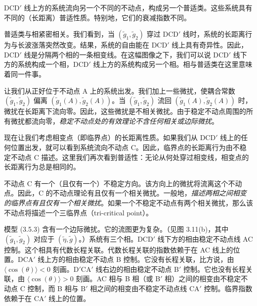 
DCD$'$ 线上方的系统流向另一个不同的不动点，构成另一个普适类。这些系统具有不同的（长距离）普适性质。特别地，它们的衰减指数不同。

普适类与相紧密相关。我们看到，当 $(\tilde{g}_1,\tilde{g}_2)$ 穿过 DCD$'$ 线时，系统的长距离行为与长波涨落突然改变。结果，系统的自由能在 DCD$'$ 线上具有奇异性。因此，DCD$'$ 线是分隔两个相的一条相变线。在这幅图像之下，我们可以说 DCD$'$ 线下方的系统构成一个相，DCD$'$ 线上方的系统构成另一个相。相与普适类在这里意味着同一件事。

让我们从正好位于不动点 A 上的系统出发。我们加上一些微扰，使耦合常数 $(\tilde{g}_1,\tilde{g}_2)$ 偏离 $(\tilde{g}_1(A),\tilde{g}_2(A))$。当 $(\tilde{g}_1,\tilde{g}_2)$ 流回 $(\tilde{g}_1(A),\tilde{g}_2(A))$ 时，微扰在长距离下流向零。因此，这些微扰是不相关微扰。由于稳定不动点周围的所有微扰都流向零，\emph{稳定不动点处的有效理论不含任何相关或边际微扰}。

现在让我们考虑相变点（即临界点）的长距离性质。如果我们从 DCD$'$ 线上的任何位置出发，就可以看到系统流向不动点 C。因此，临界点的长距离行为由不稳定不动点 C 描述。这里我们再次看到普适性：无论从何处穿过相变线，相变点的长距离行为总是相同的。

不动点 C 有一个（且仅有一个）不稳定方向。该方向上的微扰将流离这个不动点。因此，C 的不动点理论有且仅有一个相关微扰。一般地，\emph{描述两相之间相变的临界点有且仅有一个相关微扰}。如果一个不稳定不动点有两个相关微扰，那么该不动点将描述一个三临界点（tri-critical point）。

模型 (3.5.3) 含有一个边际微扰。它的流图更为复杂。（见图 3.11(b)，其中 $(\tilde{g}_1,\tilde{g}_2)$ 对应于 $(\tilde{\eta},\tilde{g})$。）系统有三个相。DCD$'$ 线下方的相由稳定不动点线 AC 控制。这个相具有代数长程关联。代数长程关联的指数依赖于在 AC 线上的位置。DCA$'$ 线上方的相由稳定不动点 B 控制。它没有长程关联，比方说，由 $\langle\cos(\theta)\rangle < 0$ 刻画。D$'$CA$'$ 线右边的相由稳定不动点 B$'$ 控制。它也没有长程关联，由 $\langle\cos(\theta)\rangle > 0$ 刻画。AC 相与 B 相（或 B$'$ 相）之间的相变由不稳定不动点 C 控制，而 B 相与 B$'$ 相之间的相变由不稳定不动点线 CA$'$ 控制。临界指数依赖于在 CA$'$ 线上的位置。

